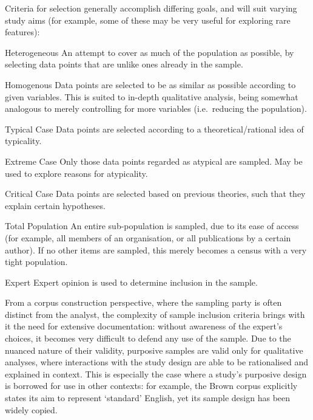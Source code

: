 Criteria for selection generally accomplish differing goals, and will suit varying study aims\cite{advice2000study} (for example, some of these may be very useful for exploring rare features):

\begin{itemizeTitle}
    \item[Heterogeneous] An attempt to cover as much of the population as possible, by selecting data points that are unlike ones already in the sample.
    \item[Homogenous] Data points are selected to be as similar as possible according to given variables.  This is suited to in-depth qualitative analysis, being somewhat analogous to merely controlling for more variables (i.e.\ reducing the population).
    \item[Typical Case] Data points are selected according to a theoretical/rational idea of typicality.
    \item[Extreme Case] Only those data points regarded as atypical are sampled.  May be used to explore reasons for atypicality.
    \item[Critical Case] Data points are selected based on previous theories, such that they explain certain hypotheses.
    \item[Total Population] An entire sub-population is sampled, due to its ease of access (for example, all members of an organisation, or all publications by a certain author).  If no other items are sampled, this merely becomes a census with a very tight population.
    \item[Expert] Expert opinion is used to determine inclusion in the sample.
\end{itemizeTitle}

From a corpus construction perspective, where the sampling party is often distinct from the analyst, the complexity of sample inclusion criteria brings with it the need for extensive documentation: without awareness of the expert's choices, it becomes very difficult to defend any use of the sample.  Due to the nuanced nature of their validity, purposive samples are valid only for qualitative analyses, where interactions with the study design are able to be rationalised and explained in context.  This is especially the case where a study's purposive design is borrowed for use in other contexts: for example, the Brown corpus explicitly states its aim to represent `standard' English, yet its sample design has been widely copied\cite{hundt1999manual,shastri1988kolhapur,mcenery2004lancaster}.

